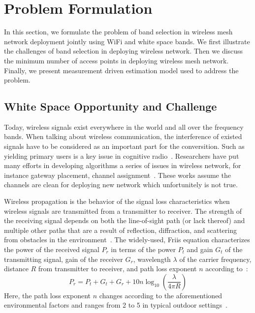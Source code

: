 \section{Problem Formulation}
\label{sec:problemformulation}

In this section, we formulate the problem of band selection in wireless 
mesh network deployment jointly using WiFi and white space bands. 
We first illustrate the challenges of band selection
in deploying wireless network. Then we discuss the minimum number of access
 points in deploying wireless mesh network. Finally, we present 
measurement driven estimation model used to address the problem. 
 
\subsection{White Space Opportunity and Challenge}
\label{subsec:motivation}

Today, wireless signals exist everywhere in the world and all over the frequency bands.
When talking about wireless communication, the interference of existed signals
 have to be considered as an important part for the conversition.
 Such as yielding primary users is a key issue in cognitive radio~\cite{haykin2005cognitive}.
 Researchers have put many efforts in developing algorithms a series of issues in wireless network,
  for instance gateway placement, channel assignment~\cite{he2008optimizing,tang2005interference}.
These works assume the channels are clean for deploying new network which unfortunitely is not true.

Wireless propagation is the behavior of the signal loss characteristics 
when wireless signals are transmitted from a transmitter to receiver.
The strength of the receiving signal depends on both the line-of-sight
path (or lack thereof) and multiple other paths that are a result of 
reflection, diffraction, and scattering from obstacles in the 
environment~\cite{andersen1995propagation}. The widely-used, Friis
equation characterizes the power of the received signal $P_r$ in terms 
of the power $P_t$ and gain $G_t$ of the transmitting signal, gain of 
the receiver $G_r$, wavelength $\lambda$ of the carrier frequency, 
distance $R$ from transmitter to receiver, and path loss exponent $n$ according 
to~\cite{friis}:
\begin{equation}
\label{eq:friis}
P_r=P_t+G_t+G_r+10n \log_{10}\left( \frac{\lambda}{4\pi R}\right)
\end{equation}
Here, the path loss exponent $n$ changes according to the
aforementioned environmental factors and ranges from 2 to 5 in typical
outdoor settings~\cite{rappaport}.

